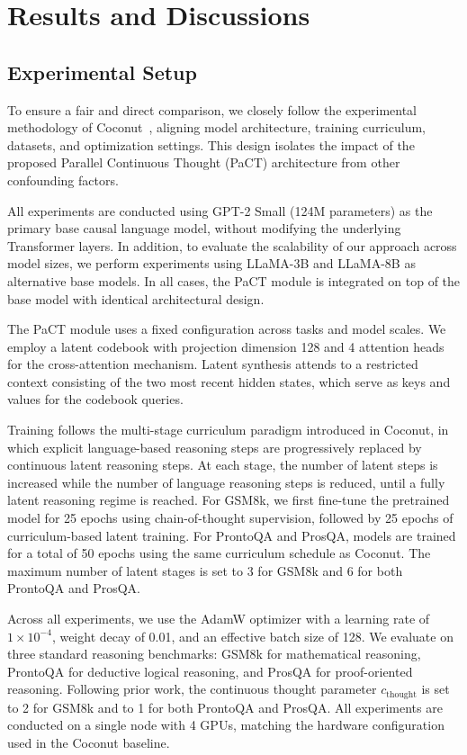 \section{Results and Discussions}

\subsection{Experimental Setup}
\label{sec:experimental_setup}

To ensure a fair and direct comparison, we closely follow the experimental methodology of Coconut~\cite{hao2024training}, aligning model architecture, training curriculum, datasets, and optimization settings. This design isolates the impact of the proposed Parallel Continuous Thought (PaCT) architecture from other confounding factors.

All experiments are conducted using GPT-2 Small (124M parameters) as the primary base causal language model, without modifying the underlying Transformer layers. In addition, to evaluate the scalability of our approach across model sizes, we perform experiments using LLaMA-3B and LLaMA-8B as alternative base models. In all cases, the PaCT module is integrated on top of the base model with identical architectural design.

The PaCT module uses a fixed configuration across tasks and model scales. We employ a latent codebook with projection dimension 128 and 4 attention heads for the cross-attention mechanism. Latent synthesis attends to a restricted context consisting of the two most recent hidden states, which serve as keys and values for the codebook queries.

Training follows the multi-stage curriculum paradigm introduced in Coconut, in which explicit language-based reasoning steps are progressively replaced by continuous latent reasoning steps. At each stage, the number of latent steps is increased while the number of language reasoning steps is reduced, until a fully latent reasoning regime is reached. For GSM8k, we first fine-tune the pretrained model for 25 epochs using chain-of-thought supervision, followed by 25 epochs of curriculum-based latent training. For ProntoQA and ProsQA, models are trained for a total of 50 epochs using the same curriculum schedule as Coconut. The maximum number of latent stages is set to 3 for GSM8k and 6 for both ProntoQA and ProsQA.

Across all experiments, we use the AdamW optimizer with a learning rate of $1\times10^{-4}$, weight decay of 0.01, and an effective batch size of 128. We evaluate on three standard reasoning benchmarks: GSM8k for mathematical reasoning, ProntoQA for deductive logical reasoning, and ProsQA for proof-oriented reasoning. Following prior work, the continuous thought parameter $c_{\text{thought}}$ is set to 2 for GSM8k and to 1 for both ProntoQA and ProsQA. All experiments are conducted on a single node with 4 GPUs, matching the hardware configuration used in the Coconut baseline.

